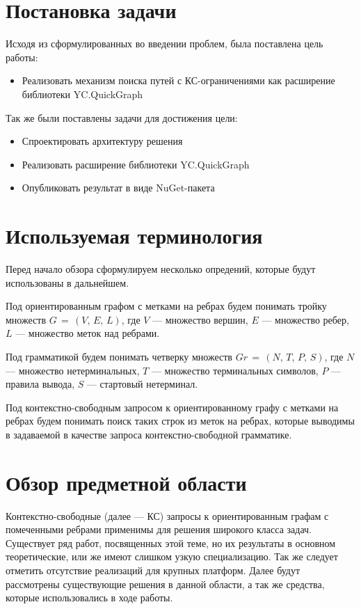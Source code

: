 \documentclass[14pt]{matmex-diploma-custom}
\begin{document}
\section{Постановка задачи}
    Исходя из сформулированных во введении проблем, была поставлена цель работы:
	\begin{itemize}
	    \item Реализовать механизм поиска путей с КС-ограничениями как расширение библиотеки YC.QuickGraph
	\end{itemize}
	Так же были поставлены задачи для достижения цели:
	\begin{itemize}
	    \item Спроектировать архитектуру решения
        \item Реализовать расширение библиотеки YC.QuickGraph
        \item Опубликовать результат в виде NuGet-пакета
	\end{itemize}

\section{Используемая терминология}
    Перед начало обзора сформулируем несколько опредений, которые будут использованы в дальнейшем.
	
	Под ориентированным графом с метками на ребрах будем понимать тройку множеств \(G\,=\,(V,\,E,\,L)\), где \(V\) --- множество вершин, \(E\) --- множество ребер, \(L\) --- множество меток над ребрами.
	
	Под грамматикой будем понимать четверку множеств \(Gr\,=\,(N,\,T,\,P,\,S)\), где \(N\) --- множество нетерминальных, \(T\) --- множество терминальных символов, \(P\) --- правила вывода, \(S\) --- стартовый нетерминал.

	Под контекстно-свободным запросом к ориентированному графу с метками на ребрах будем понимать поиск таких строк из меток на ребрах, которые выводимы в задаваемой в качестве запроса контекстно-свободной грамматике.

\section{Обзор предметной области}
	Контекстно-свободные (далее --- КС) запросы к ориентированным графам с помеченными ребрами применимы для решения широкого класса задач. Существует ряд работ, посвященных этой теме, но их результаты в основном теоретические, или же имеют слишком узкую специализацию. Так же следует отметить отсутствие реализаций для крупных платформ. Далее будут рассмотрены существующие решения в данной области, а так же средства, которые использовались в ходе работы.
\end{document}

